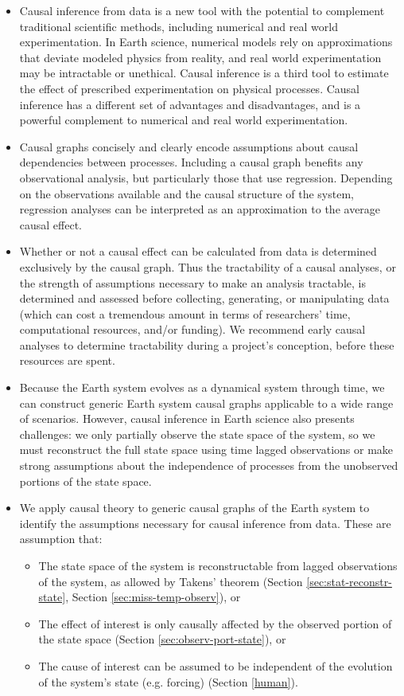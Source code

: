 \documentclass[12pt]{article}
\begin{document}
\begin{itemize}
\item Causal inference from data is a new tool with the potential to
  complement traditional scientific methods, including numerical and
  real world experimentation. In Earth science, numerical models rely
  on approximations that deviate modeled physics from reality, and
  real world experimentation may be intractable or unethical. Causal
  inference is a third tool to estimate the effect of prescribed
  experimentation on physical processes. Causal inference has a
  different set of advantages and disadvantages, and is a powerful
  complement to numerical and real world experimentation.
\item Causal graphs concisely and clearly encode assumptions about
  causal dependencies between processes. Including a causal graph
  benefits any observational analysis, but particularly those that use
  regression. Depending on the observations available and the causal
  structure of the system, regression analyses can be interpreted as
  an approximation to the average causal effect.
\item Whether or not a causal effect can be calculated from data is
  determined exclusively by the causal graph. Thus the tractability of
  a causal analyses, or the strength of assumptions necessary to make
  an analysis tractable, is determined and assessed before collecting,
  generating, or manipulating data (which can cost a tremendous amount
  in terms of researchers' time, computational resources, and/or
  funding). We recommend early causal analyses to determine
  tractability during a project's conception, before these resources
  are spent.
\item Because the Earth system evolves as a dynamical system through
  time, we can construct generic Earth system causal graphs
  applicable to a wide range of scenarios. However, causal inference
  in Earth science also presents challenges: we only partially observe
  the state space of the system, so we must reconstruct the full state
  space using time lagged observations or make strong assumptions
  about the independence of processes from the unobserved portions of
  the state space.
\item We apply causal theory to generic causal graphs of the Earth
  system to identify the assumptions necessary for causal inference
  from data. These are assumption that:
  \begin{itemize}
  \item The state space of the system is reconstructable
    from lagged observations of the system, as allowed by
    Takens' theorem (Section \ref{sec:stat-reconstr-state}, Section \ref{sec:miss-temp-observ}), or
  \item The effect of interest is only causally
    affected by the observed portion of the state space (Section
    \ref{sec:observ-port-state}), or
  \item The cause of interest can be assumed to be independent of the
    evolution of the system's state (e.g. forcing) (Section
    \ref{human}).
  \end{itemize}
\end{itemize}
\end{document}
